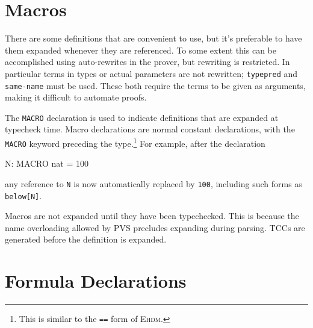 

\section{Macros}\label{macro-declarations}

There are some definitions that are convenient to use, but it's preferable
to have them expanded whenever they are referenced.  To some extent this
can be accomplished using auto-rewrites in the prover, but rewriting is
restricted.  In particular terms in types or actual parameters are not
rewritten; \texttt{typepred} and \texttt{same-name} must be used.  These
both require the terms to be given as arguments, making it difficult to
automate proofs.

The \texttt{MACRO} declaration is used to indicate definitions that are
expanded at typecheck time.  Macro declarations are normal constant
declarations, with the \texttt{MACRO} keyword preceding the
type.\footnote{This is similar to the \texttt{==} form of E\textsc{hdm}.}
For example, after the declaration
\begin{pvsex}
  N: MACRO nat = 100
\end{pvsex}
any reference to \texttt{N} is now automatically replaced by \texttt{100},
including such forms as \texttt{below[N]}.

Macros are not expanded until they have been typechecked.  This is because
the name overloading allowed by PVS precludes expanding during parsing.
TCCs are generated before the definition is expanded.



\section{Formula Declarations}\label{formula-declarations}

